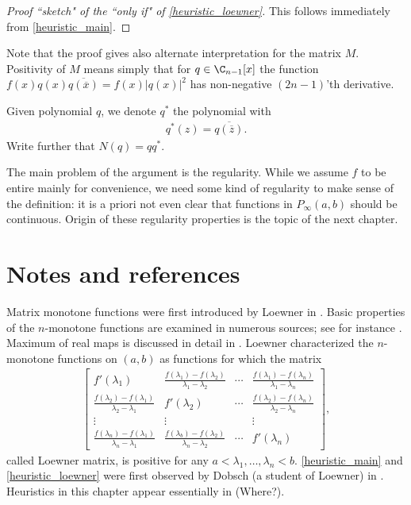 \begin{proof}[Proof ``sketch" of the ``only if" of \ref{heuristic_loewner}]
	This follows immediately from \ref{heuristic_main}.
\end{proof}

Note that the proof gives also alternate interpretation for the matrix $M$. Positivity of $M$ means simply that for $q \in \C_{n - 1}[x]$ the function $f(x) q(x) \overline{q(\overline{x})} = f(x) |q(x)|^2$ has non-negative $(2 n - 1)$'th derivative.

Given polynomial $q$, we denote $q^{*}$ the polynomial with
\begin{align*}
	q^{*}(z) = \overline{q(\overline{z})}.
\end{align*}
Write further that $N(q) = q q^{*}$.

The main problem of the argument is the regularity. While we assume $f$ to be entire mainly for convenience, we need some kind of regularity to make sense of the definition: it is a priori not even clear that functions in $P_{\infty}(a, b)$ should be continuous. Origin of these regularity properties is the topic of the next chapter.

\section{Notes and references}

Matrix monotone functions were first introduced by Loewner in \cite{Low}. Basic properties of the $n$-monotone functions are examined in numerous sources; see for instance \cite{Hiai}. Maximum of real maps is discussed in detail in \cite{Ando2}. Loewner characterized the $n$-monotone functions on $(a, b)$ as functions for which the matrix
\begin{align*}
	\begin{bmatrix}
		f'(\lambda_{1}) & \frac{f(\lambda_{1}) - f(\lambda_{2})}{\lambda_{1} - \lambda_{2}} & \cdots & \frac{f(\lambda_{1}) - f(\lambda_{n})}{\lambda_{1} - \lambda_{n}} \\
		\frac{f(\lambda_{2}) - f(\lambda_{1})}{\lambda_{2} - \lambda_{1}} & f'(\lambda_{2}) & \cdots & \frac{f(\lambda_{2}) - f(\lambda_{n})}{\lambda_{2} - \lambda_{n}} \\
		\vdots & \vdots & & \vdots \\
		\frac{f(\lambda_{n}) - f(\lambda_{1})}{\lambda_{n} - \lambda_{1}} & \frac{f(\lambda_{b}) - f(\lambda_{2})}{\lambda_{n} - \lambda_{2}} & \cdots & f'(\lambda_{n}) 
	\end{bmatrix},
\end{align*}
called Loewner matrix, is positive for any $a < \lambda_{1}, \ldots, \lambda_{n} < b$. \ref{heuristic_main} and \ref{heuristic_loewner} were first observed by Dobsch (a student of Loewner) in \cite{Dob}. Heuristics in this chapter appear essentially in (Where?).



